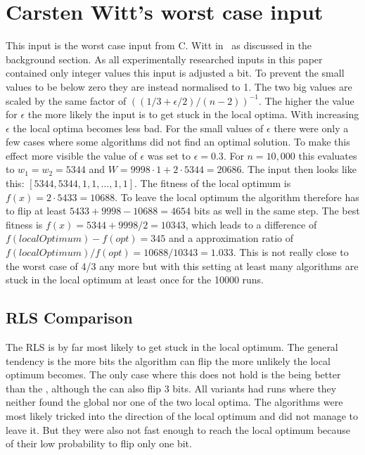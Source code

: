 \section{Carsten Witt's worst case input}
This input is the worst case input from C. Witt in~\cite{witt2005worst} as discussed in the background section.
As all experimentally researched inputs in this paper contained only integer values this input is adjusted a bit.
To prevent the small values to be below zero they are instead normalised to 1.
The two big values are scaled by the same factor of ${((1/3+\epsilon/2)/(n-2))}^{-1}$.
The higher the value for $\epsilon$ the more likely the input is to get stuck in the local optima.
With increasing $\epsilon$ the local optima becomes less bad.
For the small values of $\epsilon$ there were only a few cases where some algorithms did not find an optimal solution.
To make this effect more visible the value of $\epsilon$ was set to $\epsilon=0.3$.\newline
For $n=10,000$ this evaluates to $w_1=w_2=5344$ and $W=9998 \cdot 1 + 2 \cdot 5344 = 20686$.
The input then looks like this: $[5344, 5344, 1, 1, \dots, 1, 1]$.
The fitness of the local optimum is $f(x) = 2 \cdot 5433 = 10688$.
To leave the local optimum the algorithm therefore has to flip at least  $5433+9998-10688 = 4654$ bits as well in the same step.
The best fitness is $f(x) = 5344 + 9998/2 = 10343$, which leads to a difference of $f(localOptimum)-f(opt) = 345$ and a approximation ratio of $f(localOptimum)/f(opt)=10688/10343=1.033$.
This is not really close to the worst case of 4/3 any more but with this setting at least many algorithms are stuck in the local optimum at least once for the 10000 runs.
\subsection{RLS Comparison}


The RLS is by far most likely to get stuck in the local optimum.
The general tendency is the more bits the algorithm can flip the more unlikely the local optimum becomes.
The only case where this does not hold is the \RLSN[2] being better than the \RLSR[3], although the \RLSR[3] can also flip 3 bits.
All \RLSN[s] variants had runs where they neither found the global nor one of the two local optima.
The algorithms were most likely tricked into the direction of the local optimum and did not manage to leave it.
But they were also not fast enough to reach the local optimum because of their low probability to flip only one bit.
